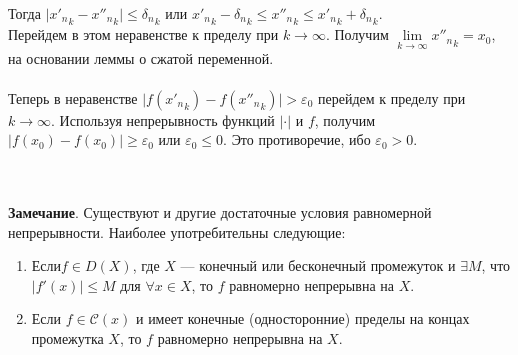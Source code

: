 \begin{Proof}
		Тогда \hspace{0.3 cm} $\vert {x'_n}_k - {x''_n}_k \vert \leqslant {\delta_n}_k$      \hspace{0.3 cm} или \hspace{0.3 cm} 
		${x'_n}_k - {\delta_n}_k \leqslant {x''_n}_k \leqslant {x'_n}_k + {\delta_n}_k$.\\
		Перейдем в этом неравенстве к пределу при $k \rightarrow \infty$. Получим $\lim\limits_{k \rightarrow \infty} {x''_n}_k = x_0$, на основании леммы о сжатой переменной. \\\\
		Теперь в неравенстве $\vert f({x'_n}_k) - f({x''_n}_k)\vert > \varepsilon_0$ перейдем к пределу при $k \rightarrow \infty$. Используя непрерывность функций $\vert \cdot \vert$ и $f$, получим $\vert f(x_0) - f(x_0)\vert \geqslant \varepsilon_0$ или $\varepsilon_0 \leqslant 0$. Это противоречие, ибо $\varepsilon_0 > 0$.
	\end{Proof}\\\\
	\textbf{Замечание}. Существуют и другие достаточные условия равномерной непрерывности. Наиболее употребительны следующие:\begin{enumerate}
		\item Если$f \in D(X)$, где $X$ --- конечный или бесконечный промежуток и $\exists M$, что $\vert f'(x)\vert \leqslant M$ для $\forall x \in X$, то $f$ равномерно непрерывна на $X$.
		\item Если $f \in \mathcal{C}(x)$ и имеет конечные (односторонние) пределы на концах промежутка $X$, то $f$ равномерно непрерывна на $X$.
	\end{enumerate}
